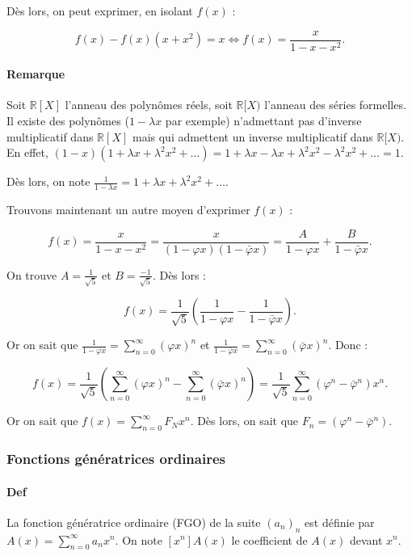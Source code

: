 \documentclass{article}
\begin{document}
			Dès lors, on peut exprimer, en isolant $f(x)$ :

			\[f(x)  - f(x)(x+x^2) = x \iff f(x) = \frac x{1-x-x^2}.\]

			\paragraph{Remarque} Soit $\mathbb R[X]$ l'anneau des polynômes réels, soit $\mathbb R[X)$ l'anneau des séries formelles. Il existe des polynômes ($1-\lambda x$ par exemple) n'admettant
			pas d'inverse multiplicatif dans $\mathbb R[X]$ mais qui admettent un inverse multiplicatif dans $\mathbb R[X)$. En effet, $(1-x)(1 + \lambda x + \lambda^2x^2 + \ldots) =
			1 + \lambda x - \lambda x + \lambda^2 x^2 - \lambda^2 x^2 + \ldots = 1$.

			Dès lors, on note $\frac 1{1-\lambda x} = 1+\lambda x+\lambda^2 x^2+\ldots$.

			Trouvons maintenant un autre moyen d'exprimer $f(x)$ :

			\[f(x) = \frac x{1-x-x^2} = \frac x{(1-\varphi x)(1 - \bar\varphi x)} = \frac A{1-\varphi x} + \frac B{1-\bar\varphi x}.\]

			On trouve $A = \frac 1{\sqrt 5}$ et $B = \frac {-1}{\sqrt 5}$. Dès lors :

			\[f(x) = \frac 1{\sqrt 5} \left(\frac 1{1-\varphi x} - \frac 1{1-\bar\varphi x}\right).\]

			Or on sait que $\frac 1{1-\varphi x} = \sum_{n=0}^\infty (\varphi x)^n$ et $\frac 1{1-\bar\varphi x} = \sum_{n=0}^\infty(\bar\varphi x)^n$. Donc :

			\[f(x) = \frac 1{\sqrt 5}\left(\sum_{n=0}^\infty(\varphi x)^n - \sum_{n=0}^\infty(\bar\varphi x)^n\right) = \frac 1{\sqrt 5}\sum_{n=0}^\infty(\varphi^n - \bar\varphi^n)x^n.\]

			Or on sait que $f(x) = \sum_{n=0}^\infty F_Nx^n$. Dès lors, on sait que $F_n = (\varphi^n - \bar\varphi^n)$.

			\subsubsection{Fonctions génératrices ordinaires}

			\paragraph{Def} La fonction génératrice ordinaire (FGO) de la suite $(a_n)_n$ est définie par $A(x) = \sum_{n=0}^\infty a_nx^n$. On note $[x^n]A(x)$ le coefficient de $A(x)$ devant $x^n$.
\end{document}
